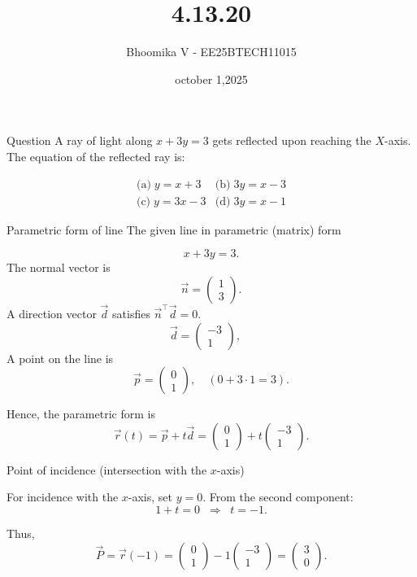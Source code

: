 \documentclass{beamer}
\begin{document}
\title 
{4.13.20}
\date{october 1,2025}


\author 
{Bhoomika V - EE25BTECH11015}




\frame{\titlepage}
\begin{frame}{Question}
A ray of light along $x + 3y = 3$ gets reflected upon reaching the $X$-axis.  
The equation of the reflected ray is:  

\[
\begin{array}{cc}
\text{(a)} \; y = x + 3 & \text{(b)} \; 3y = x - 3 \\[8pt]
\text{(c)} \; y = 3x - 3 & \text{(d)} \; 3y = x - 1
\end{array}
\]
\end{frame}

\begin{frame}{Parametric form of line}
The given line in parametric (matrix) form

\[
x+3y=3.
\]
The normal vector is 
\[
\vec{n}=\begin{pmatrix}1\\3\end{pmatrix}.
\]
A direction vector $\vec{d}$ satisfies $\vec{n}^\top \vec{d}=0$.  
\[
\vec{d}=\begin{pmatrix}-3\\1\end{pmatrix}, 
\quad 
\]
A point on the line is 
\[
\vec{p}=\begin{pmatrix}0\\1\end{pmatrix}, \quad (0+3\cdot 1=3).
\]

Hence, the parametric form is
\[
\vec{r}(t)=\vec{p}+t\vec{d}
=\begin{pmatrix}0\\1\end{pmatrix}+t\begin{pmatrix}-3\\1\end{pmatrix}.
\]
\end{frame}

\begin{frame}
Point of incidence (intersection with the $x$-axis)


For incidence with the $x$-axis, set $y=0$.  
From the second component:
\[
1+t=0 \;\;\Rightarrow\;\; t=-1.
\]

Thus,
\[
\vec{P}=\vec{r}(-1)
=\begin{pmatrix}0\\1\end{pmatrix} -1\begin{pmatrix}-3\\1\end{pmatrix}
=\begin{pmatrix}3\\0\end{pmatrix}.
\]

\end{frame}
\end{document}
